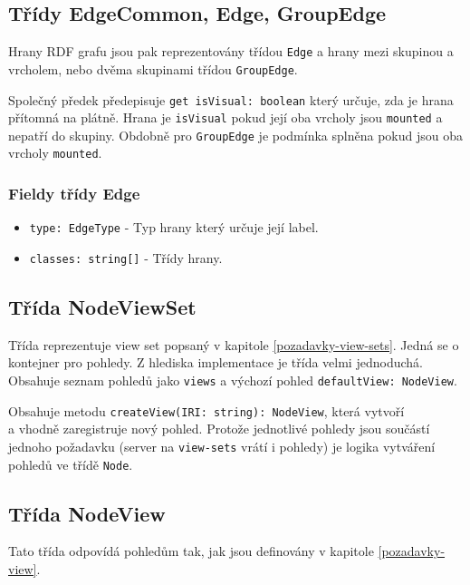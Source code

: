 \subsection{Třídy EdgeCommon, Edge, GroupEdge}
Hrany RDF grafu jsou pak reprezentovány třídou \texttt{Edge} a hrany mezi skupinou a vrcholem, nebo dvěma skupinami třídou \texttt{GroupEdge}.

Společný předek předepisuje \texttt{get isVisual: boolean} který určuje, zda je hrana přítomná na plátně. Hrana je \texttt{isVisual} pokud její oba vrcholy jsou \texttt{mounted} a nepatří do skupiny. Obdobně pro \texttt{GroupEdge} je podmínka splněna pokud jsou oba vrcholy \texttt{mounted}.

\subsubsection*{Fieldy třídy Edge}
\begin{itemize}
  \item \texttt{type: EdgeType} - Typ hrany který určuje její label.
  \item \texttt{classes: string[]} - Třídy hrany.
\end{itemize}

\subsection{Třída NodeViewSet}
Třída reprezentuje view set popsaný v kapitole \ref{pozadavky-view-sets}. Jedná se o kontejner pro pohledy. Z hlediska implementace je třída velmi jednoduchá. Obsahuje seznam pohledů jako \texttt{views} a výchozí pohled \texttt{defaultView: NodeView}.

Obsahuje metodu \texttt{createView(IRI: string): NodeView}, která vytvoří \\a vhodně zaregistruje nový pohled. Protože jednotlivé pohledy jsou součástí jednoho požadavku (server na \texttt{view-sets} vrátí i pohledy) je logika vytváření pohledů ve třídě \texttt{Node}.

\subsection{Třída NodeView}
Tato třída odpovídá pohledům tak, jak jsou definovány v kapitole \ref{pozadavky-view}.

